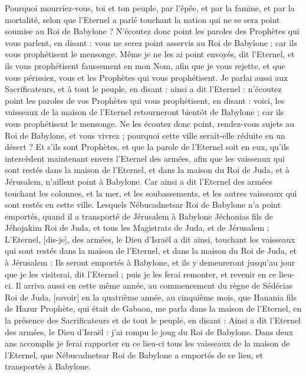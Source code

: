 \begin{multicols}{2}
Pourquoi mourriez-vous, toi et ton peuple, par l'épée, et par la famine, et par la mortalité, selon que l'Eternel a parlé touchant la nation qui ne se sera point soumise au Roi de Babylone ?
N'écoutez donc point les paroles des Prophètes qui vous parlent, en disant : vous ne serez point asservis au Roi de Babylone ; car ils vous prophétisent le mensonge.
Même je ne les ai point envoyés, dit l'Eternel, et ils vous prophétisent faussement en mon Nom, afin que je vous rejette, et que vous périssiez, vous et les Prophètes qui vous prophétisent.
Je parlai aussi aux Sacrificateurs, et à tout le peuple, en disant : ainsi a dit l'Eternel : n'écoutez point les paroles de vos Prophètes qui vous prophétisent, en disant : voici, les vaisseaux de la maison de l'Eternel retourneront bientôt de Babylone ; car ils vous prophétisent le mensonge.
Ne les écoutez donc point, rendez-vous sujets au Roi de Babylone, et vous vivrez ; pourquoi cette ville serait-elle réduite en un désert ?
Et s'ils sont Prophètes, et que la parole de l'Eternel soit en eux, qu'ils intercèdent maintenant envers l'Eternel des armées, afin que les vaisseaux qui sont restés dans la maison de l'Eternel, et dans la maison du Roi de Juda, et à Jérusalem, n'aillent point à Babylone.
Car ainsi a dit l'Eternel des armées touchant les colonnes, et la mer, et les soubassements, et les autres vaisseaux qui sont restés en cette ville.
Lesquels Nébucadnetsar Roi de Babylone n'a point emportés, quand il a transporté de Jérusalem à Babylone Jéchonias fils de Jéhojakim Roi de Juda, et tous les Magistrats de Juda, et de Jérusalem ;
L'Eternel, [dis-je], des armées, le Dieu d'Israël a dit ainsi, touchant les vaisseaux qui sont restés dans la maison de l'Eternel, et dans la maison du Roi de Juda, et à Jérusalem :
Ils seront emportés à Babylone, et ils y demeureront jusqu’au jour que je les visiterai, dit l'Eternel ; puis je les ferai remonter, et revenir en ce lieu-ci.
\VerseOne{}Il arriva aussi en cette même année, au commencement du règne de Sédécias Roi de Juda, [savoir] en la quatrième année, au cinquième mois, que Hanania fils de Hazur Prophète, qui était de Gabaon, me parla dans la maison de l'Eternel, en la présence des Sacrificateurs et de tout le peuple, en disant :
Ainsi a dit l'Eternel des armées, le Dieu d'Israël : j'ai rompu le joug du Roi de Babylone.
Dans deux ans accomplis je ferai rapporter en ce lieu-ci tous les vaisseaux de la maison de l'Eternel, que Nébucadnetsar Roi de Babylone a emportés de ce lieu, et transportés à Babylone.

\end{multicols}
